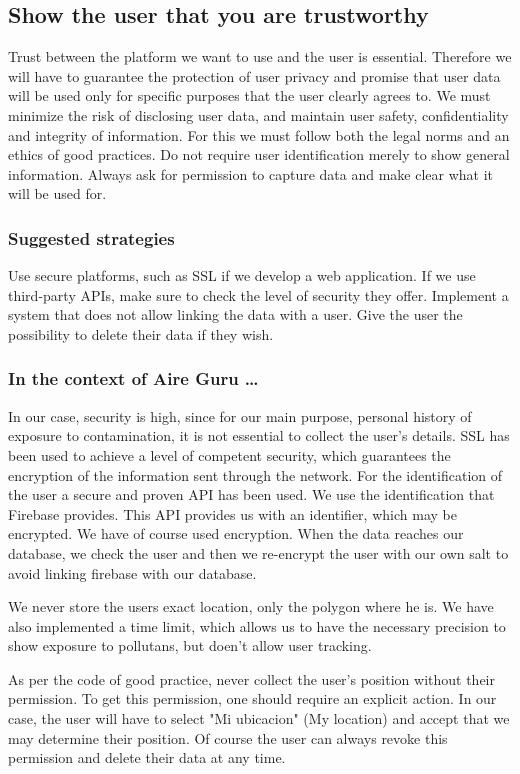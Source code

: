 \subsection{Show the user that you are trustworthy}
Trust between the platform we want to use and the user is essential.
Therefore we will have to guarantee the protection of user privacy and promise that user data will be used only for specific purposes that the user clearly agrees to.
We must minimize the risk of disclosing user data, and maintain user safety, confidentiality and integrity of information.
For this we must follow both the legal norms and an ethics of good practices.
Do not require user identification merely to show general information.
Always ask for permission to capture data and make clear what it will be used for.

\subsubsection*{Suggested strategies} 
Use secure platforms, such as SSL if we develop a web application.
If we use third-party APIs, make sure to check the level of security they offer.
Implement a system that does not allow linking the data with a user.
Give the user the possibility to delete their data if they wish.


\subsubsection*{In the context of Aire Guru \ldots} 
In our case, security is high, since for our main purpose, personal history
of exposure to contamination, it is not essential to collect the user's details.
SSL has been used to achieve a level of competent security, which guarantees the encryption of
the information sent through the network.
For the identification of the user a secure and proven API has been used. We use the identification
that Firebase provides. This API provides us with an identifier, which may be encrypted.
We have of course used encryption. When the data reaches our database,
we check the user and then we re-encrypt the user with our own salt to
avoid linking firebase with our database.

We never store the users exact location, only the polygon where he is.
We have also implemented a time limit, which allows us to have the necessary precision to show exposure to pollutans, but doen't allow user tracking.

As per the code of good practice, never collect the user's position without their permission.
To get this permission, one should require an explicit action. In our case, the user will have to select "Mi ubicacion" (My location) and accept 
that we may determine their position. Of course the user can always revoke this permission and
delete their data at any time. \\

